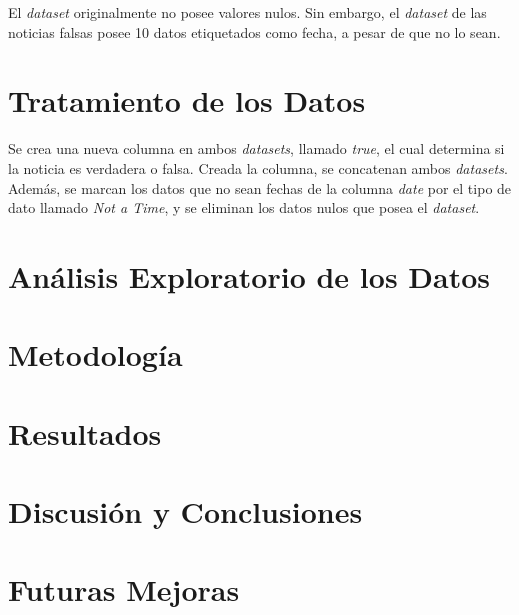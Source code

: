 {El \textit{dataset} originalmente no posee valores nulos. Sin embargo, el \textit{dataset} de las noticias falsas posee 10 datos etiquetados como fecha, a pesar de que no lo sean.
}

\section{Tratamiento de los Datos}
{
Se crea una nueva columna en ambos \textit{datasets}, llamado \textit{true}, el cual determina si la noticia es verdadera o falsa. Creada la columna, se concatenan ambos \textit{datasets}. Además, se marcan los datos que no sean fechas de la columna \textit{date} por el tipo de dato llamado \textit{Not a Time}, y se eliminan los datos nulos que posea el \textit{dataset}.
}

\section{Análisis Exploratorio de los Datos}
{
\lipsum[1]
}

\section{Metodología}
{
\lipsum[1]
}

\section{Resultados}
{
\lipsum[1]
}

\section{Discusión y Conclusiones}
{
\lipsum[1]
}

\section{Futuras Mejoras}
{
\lipsum[1]
}

